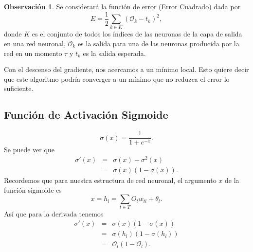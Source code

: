 \documentclass[12pt,letterpaper]{article}
\theoremstyle{definition}
\theoremstyle{definition}
\newtheorem{obs}{Observaci\'on}
\theoremstyle{definition}
\theoremstyle{definition}
\theoremstyle{definition}
\theoremstyle{definition}
\begin{document}
	\begin{obs}
		Se considerará la funci\'on de error (Error Cuadrado) dada por 
		\begin{equation*}
			E=\dfrac{1}{2}\sum_{k\in K} (\mathcal{O}_{k}-t_{k})^2,
		\end{equation*}
		donde $ K $ es el conjunto de todos los índices de las neuronas de la capa de salida en una red neuronal, $ \mathcal{O}_k $ es la salida  para una de las neuronas producida por la red en un momento $ \tau $ y $ t_{k} $ es la salida esperada. 
	\end{obs}
	Con el descenso del gradiente, nos acercamos a un mínimo local. Esto quiere decir que este algoritmo podría converger a un mínimo que no reduzca el error lo suficiente.
	\begin{center}
	\end{center}
	
	\subsection{Función de Activación Sigmoide}
	\begin{equation}
		\sigma(x)=\dfrac{1}{1+e^{-x}}.
	\end{equation}
	Se puede ver que
	\begin{eqnarray*}
		\sigma'(x)&=&\sigma(x)-\sigma^{2}(x)\\
		&=&\sigma(x)(1-\sigma(x)).
	\end{eqnarray*}
	Recordemos que para nuestra estructura de red neuronal, el argumento $ x $ de la función sigmoide es 
	\[ x= h_l =\sum_{t\in T} O_t w_{tl}+\theta_l. \]
	Así que para la derivada tenemos
	\begin{eqnarray*}
		\sigma'(x)&=&\sigma(x)(1-\sigma(x))\\
		&=&\sigma(h_l)(1-\sigma(h_l)) \\
		&=&\mathcal{O}_l (1-\mathcal{O}_l).
	\end{eqnarray*}
	
\end{document}
